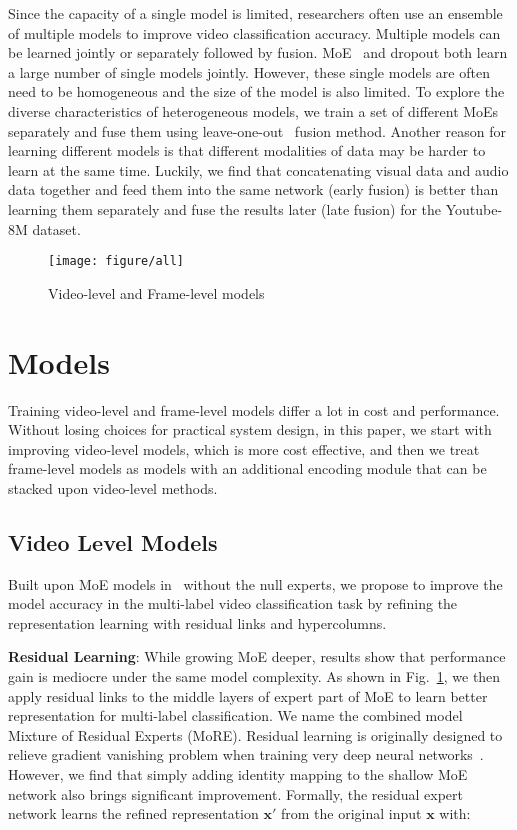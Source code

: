 \documentclass[10pt,twocolumn,letterpaper]{article}
\begin{document}
Since the capacity of a single model is limited, researchers often use an ensemble of multiple models to improve video classification accuracy. Multiple models can be learned jointly or separately followed by fusion. MoE~\cite{jacobs1991adaptive} and dropout \cite{srivastava2014dropout} both learn a large number of single models jointly. However, these single models are often need to be homogeneous and the size of the model is also limited. To explore the diverse characteristics of heterogeneous models, we train a set of different MoEs separately and fuse them using leave-one-out~\cite{lan2013cmu} fusion method. Another reason for learning different models is that different modalities of data may be harder to learn at the same time.  
Luckily, we find that concatenating visual data and audio data together and feed them into the same network (early fusion) is better than learning them separately and fuse the results later (late fusion) for the Youtube-8M dataset. 




\begin{figure}
    \centering
    \texttt{[image: figure/all]}
    \caption{Video-level and Frame-level models}
    \label{fig:all}
\end{figure}

\section{Models} 
Training video-level and frame-level models differ a lot in cost and performance. Without losing choices for practical system design, in this paper, we start with improving video-level models, which is more cost effective, and then we treat frame-level models as models with an additional encoding module that can be stacked upon video-level methods.





\subsection{Video Level Models} 
Built upon MoE models in~\cite{yt8m} without the null experts, we propose to improve the model accuracy in the multi-label video classification task by refining the representation learning with residual links and hypercolumns.

\textbf{Residual Learning}:
While growing MoE deeper, results show that performance gain is mediocre under the same model complexity. As shown in Fig.~\ref{fig:all}, we then apply residual links to the middle layers of expert part of MoE to learn better representation for multi-label classification. We name the combined model Mixture of Residual Experts (MoRE). Residual learning is originally designed to relieve gradient vanishing problem when training very deep neural networks~\cite{he2016deep}. However, we find that simply adding identity mapping to the shallow MoE network also brings significant improvement. Formally, the residual expert network learns the refined representation $\mathbf{x}'$ from the original input $\mathbf{x}$ with:
\end{document}
